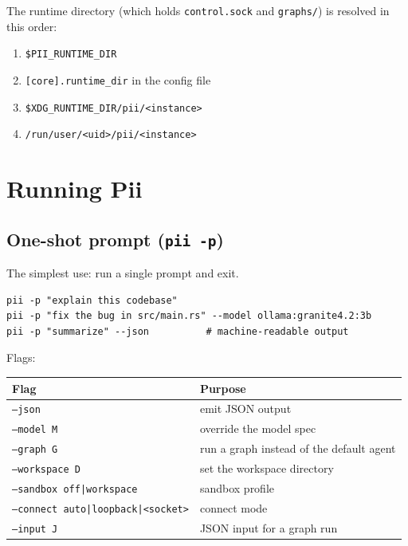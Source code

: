 \documentclass[
	fontsize=10pt,
	twoside=false,
	secnumdepth=2,
	open=any,
]{kaobook}
\begin{document}
The runtime directory (which holds \texttt{control.sock} and
\texttt{graphs/}) is resolved in this order:

\begin{enumerate}
    \item \texttt{\$PII\_RUNTIME\_DIR}
    \item \texttt{[core].runtime\_dir} in the config file
    \item \texttt{\$XDG\_RUNTIME\_DIR/pii/<instance>}
    \item \texttt{/run/user/<uid>/pii/<instance>}
\end{enumerate}

\chapter{Running Pii}
\label{chap:run}

\section{One-shot prompt (\texttt{pii -p})}

The simplest use: run a single prompt and exit.

\begin{cmdbox}
\begin{lstlisting}
pii -p "explain this codebase"
pii -p "fix the bug in src/main.rs" --model ollama:granite4.2:3b
pii -p "summarize" --json          # machine-readable output
\end{lstlisting}
\end{cmdbox}

Flags:

\begin{longtable}{@{}ll@{}}
\toprule
\textbf{Flag} & \textbf{Purpose} \\
\midrule
\endhead
\texttt{--json} & emit JSON output \\
\texttt{--model M} & override the model spec \\
\texttt{--graph G} & run a graph instead of the default agent \\
\texttt{--workspace D} & set the workspace directory \\
\texttt{--sandbox off|workspace} & sandbox profile \\
\texttt{--connect auto|loopback|<socket>} & connect mode \\
\texttt{--input J} & JSON input for a graph run \\
\bottomrule
\end{longtable}
\end{document}
